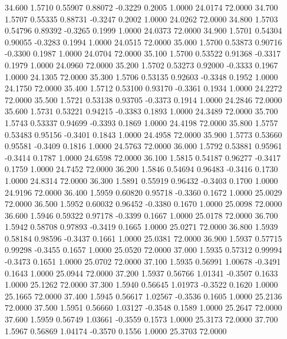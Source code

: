   34.600   1.5710   0.55907   0.88072  -0.3229   0.2005   1.0000  24.0174  72.0000
  34.700   1.5707   0.55335   0.88731  -0.3247   0.2002   1.0000  24.0262  72.0000
  34.800   1.5703   0.54796   0.89392  -0.3265   0.1999   1.0000  24.0373  72.0000
  34.900   1.5701   0.54304   0.90055  -0.3283   0.1994   1.0000  24.0515  72.0000
  35.000   1.5700   0.53873   0.90716  -0.3300   0.1987   1.0000  24.0704  72.0000
  35.100   1.5700   0.53522   0.91368  -0.3317   0.1979   1.0000  24.0960  72.0000
  35.200   1.5702   0.53273   0.92000  -0.3333   0.1967   1.0000  24.1305  72.0000
  35.300   1.5706   0.53135   0.92603  -0.3348   0.1952   1.0000  24.1750  72.0000
  35.400   1.5712   0.53100   0.93170  -0.3361   0.1934   1.0000  24.2272  72.0000
  35.500   1.5721   0.53138   0.93705  -0.3373   0.1914   1.0000  24.2846  72.0000
  35.600   1.5731   0.53221   0.94215  -0.3383   0.1893   1.0000  24.3489  72.0000
  35.700   1.5743   0.53337   0.94699  -0.3393   0.1869   1.0000  24.4198  72.0000
  35.800   1.5757   0.53483   0.95156  -0.3401   0.1843   1.0000  24.4958  72.0000
  35.900   1.5773   0.53660   0.95581  -0.3409   0.1816   1.0000  24.5763  72.0000
  36.000   1.5792   0.53881   0.95961  -0.3414   0.1787   1.0000  24.6598  72.0000
  36.100   1.5815   0.54187   0.96277  -0.3417   0.1759   1.0000  24.7452  72.0000
  36.200   1.5846   0.54694   0.96483  -0.3416   0.1730   1.0000  24.8314  72.0000
  36.300   1.5891   0.55919   0.96432  -0.3403   0.1700   1.0000  24.9196  72.0000
  36.400   1.5959   0.60820   0.95718  -0.3360   0.1672   1.0000  25.0029  72.0000
  36.500   1.5952   0.60032   0.96452  -0.3380   0.1670   1.0000  25.0098  72.0000
  36.600   1.5946   0.59322   0.97178  -0.3399   0.1667   1.0000  25.0178  72.0000
  36.700   1.5942   0.58708   0.97893  -0.3419   0.1665   1.0000  25.0271  72.0000
  36.800   1.5939   0.58184   0.98596  -0.3437   0.1661   1.0000  25.0381  72.0000
  36.900   1.5937   0.57715   0.99298  -0.3455   0.1657   1.0000  25.0520  72.0000
  37.000   1.5935   0.57312   0.99994  -0.3473   0.1651   1.0000  25.0702  72.0000
  37.100   1.5935   0.56991   1.00678  -0.3491   0.1643   1.0000  25.0944  72.0000
  37.200   1.5937   0.56766   1.01341  -0.3507   0.1633   1.0000  25.1262  72.0000
  37.300   1.5940   0.56645   1.01973  -0.3522   0.1620   1.0000  25.1665  72.0000
  37.400   1.5945   0.56617   1.02567  -0.3536   0.1605   1.0000  25.2136  72.0000
  37.500   1.5951   0.56660   1.03127  -0.3548   0.1589   1.0000  25.2647  72.0000
  37.600   1.5959   0.56749   1.03661  -0.3559   0.1573   1.0000  25.3173  72.0000
  37.700   1.5967   0.56869   1.04174  -0.3570   0.1556   1.0000  25.3703  72.0000
